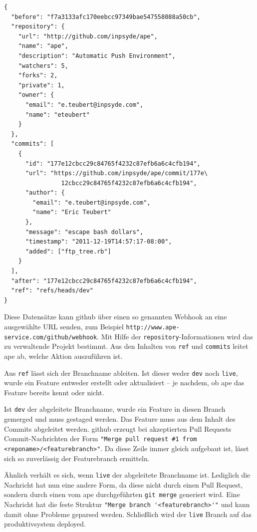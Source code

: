 \begin{lstlisting}[caption=Beispiel-Webhook von \gls{github},label={lst:example_payload}]
{
  "before": "f7a3133afc170eebcc97349bae547558088a50cb",
  "repository": {
    "url": "http://github.com/inpsyde/ape",
    "name": "ape",
    "description": "Automatic Push Environment",
    "watchers": 5,
    "forks": 2,
    "private": 1,
    "owner": {
      "email": "e.teubert@inpsyde.com",
      "name": "eteubert"
    }
  },
  "commits": [
    {
      "id": "177e12cbcc29c84765f4232c87efb6a6c4cfb194",
      "url": "https://github.com/inpsyde/ape/commit/177e\
				12cbcc29c84765f4232c87efb6a6c4cfb194",
      "author": {
        "email": "e.teubert@inpsyde.com",
        "name": "Eric Teubert"
      },
      "message": "escape bash dollars",
      "timestamp": "2011-12-19T14:57:17-08:00",
      "added": ["ftp_tree.rb"]
    }
  ],
  "after": "177e12cbcc29c84765f4232c87efb6a6c4cfb194",
  "ref": "refs/heads/dev"
}
\end{lstlisting}

Diese Datensätze kann \gls{github} über einen so genannten Webhook an eine ausgewählte URL senden, zum Beispiel \lstinline!http://www.ape-service.com/github/webhook!. Mit Hilfe der \lstinline!repository!-Informationen wird das zu verwaltende Projekt bestimmt. Aus den Inhalten von \lstinline!ref! und \lstinline!commits! leitet \gls{ape} ab, welche Aktion auszuführen ist.

Aus \lstinline!ref! lässt sich der Branchname ableiten. Ist dieser weder \lstinline!dev! noch \lstinline!live!, wurde ein Feature entweder erstellt oder aktualisiert -- je nachdem, ob \gls{ape} das Feature bereits kennt oder nicht.

Ist \lstinline!dev! der abgeleitete Branchname, wurde ein Feature in diesen Branch gemerged und muss gestaged werden. Das Feature muss aus dem Inhalt des Commits abgeleitet werden. \gls{github} erzeugt bei akzeptierten Pull Requests Commit-Nachrichten der Form \lstinline!"Merge pull request #1 from <reponame>/<featurebranch>"!. Da diese Zeile immer gleich aufgebaut ist, lässt sich so zuverlässig der Featurebranch ermitteln.

Ähnlich verhält es sich, wenn \lstinline!live! der abgeleitete Branchname ist. Lediglich die Nachricht hat nun eine andere Form, da diese nicht durch einen Pull Request, sondern durch einen vom \gls{ape} durchgeführten \lstinline!git merge! generiert wird. Eine Nachricht hat die feste Struktur \lstinline!"Merge branch '<featurebranch>'"! und kann damit ohne Probleme geparsed werden. Schließlich wird der \lstinline!live! Branch auf das \gls{produktivsystem} deployed.

